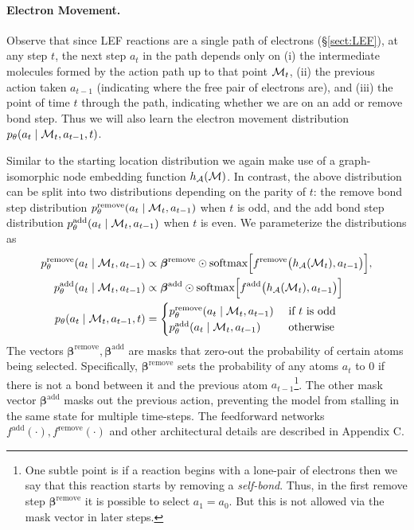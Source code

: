 \paragraph{Electron Movement.}
Observe that since LEF reactions are a single path of electrons (\S \ref{sect:LEF}), at any step $t$, the next step $a_t$ in the path depends only on (i) the intermediate molecules formed by the action path up to that point ${\mathcal{M}}_t$, (ii) the previous action taken $a_{t-1}$ (indicating where the free pair of electrons are), and (iii) the point of time $t$ through the path, indicating whether we are on an add or remove bond step. Thus we will also learn the electron movement distribution $p_\theta(a_t \mid {\mathcal{M}}_{t}, a_{t-1}, t)$.

Similar to the starting location distribution we again make use of a graph-isomorphic node embedding function $h_{{\mathcal{A}}}({\mathcal{M}})$. 
In contrast, the above distribution can be split into two distributions depending on the parity of $t$:
the remove bond step distribution $p_\theta^\textrm{remove}(a_t \mid  {\mathcal{M}}_t, a_{t-1})$ when $t$ is odd, 
and the add bond step distribution $p_\theta^\textrm{add}(a_t \mid {\mathcal{M}}_t, a_{t-1})$ when $t$ is even. We parameterize the distributions as
\begin{align}
p_\theta^\textrm{remove}(a_t \mid  {\mathcal{M}}_t, a_{t-1}) &\propto \bm{\beta}^\textrm{remove} \odot \mbox{softmax}\Big[f^\textrm{remove}\big(h_{{\mathcal{A}}}({\mathcal{M}}_t), a_{t-1}\big)\Big], \\
p_\theta^\textrm{add}(a_t \mid {\mathcal{M}}_t, a_{t-1}) &\propto \bm{\beta}^\textrm{add} \odot \mbox{softmax}\Big[f^\textrm{add}\big(h_{{\mathcal{A}}}({\mathcal{M}}_t), a_{t-1}\big)\Big] \\
p_\theta(a_t \mid {\mathcal{M}}_{t}, a_{t-1}, t) &= 
\begin{cases}
p_\theta^\textrm{remove}(a_t \mid  {\mathcal{M}}_t, a_{t-1}) & \mbox{ if } t \mbox{ is odd} \\
p_\theta^\textrm{add}(a_t \mid {\mathcal{M}}_t, a_{t-1}) & \mbox{ otherwise }
\end{cases}
\end{align}
The vectors $\bm{\beta}^\textrm{remove},\bm{\beta}^\textrm{add}$ are masks that zero-out the probability of certain atoms being selected. Specifically, $\bm{\beta}^\mathrm{remove}$ sets the probability of any atoms $a_t$ to 0 if there is not a bond between it and the previous atom $a_{t-1}$\footnote{One subtle point is if a reaction begins with a lone-pair of electrons then we say that this reaction starts by removing a \emph{self-bond}. Thus, in the first remove step $\bm{\beta}^\mathrm{remove}$ it is possible to select $a_1 \!=\! a_0$. But this is not allowed via the mask vector in later steps.}. The other mask vector $\bm{\beta}^\textrm{add}$ masks out the previous action, preventing the model from stalling in the same state for multiple time-steps. %
The feedforward networks $f^{\mathrm{add}}(\cdot), f^{\mathrm{remove}}(\cdot)$ and other architectural details are described in Appendix C.



